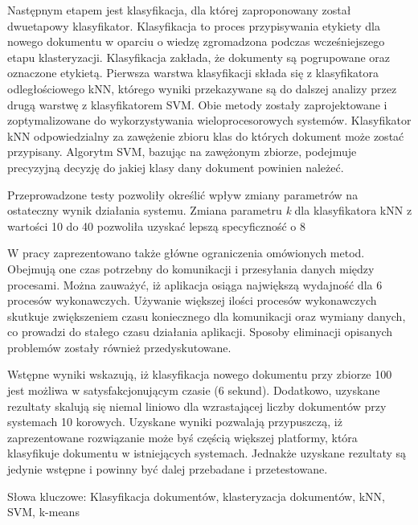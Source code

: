 Następnym etapem jest klasyfikacja, dla której zaproponowany został dwuetapowy klasyfikator. Klasyfikacja to proces przypisywania etykiety dla nowego dokumentu w oparciu o wiedzę zgromadzona podczas wcześniejszego etapu klasteryzacji. Klasyfikacja zakłada, że dokumenty są pogrupowane oraz oznaczone etykietą. Pierwsza warstwa klasyfikacji składa się z klasyfikatora odległościowego kNN, którego wyniki przekazywane są do dalszej analizy przez drugą warstwę z klasyfikatorem SVM. Obie metody zostały zaprojektowane i zoptymalizowane do wykorzystywania wieloprocesorowych systemów. Klasyfikator kNN odpowiedzialny za zawężenie zbioru klas do których dokument może zostać przypisany. Algorytm SVM, bazując na zawężonym zbiorze, podejmuje precyzyjną decyzję do jakiej klasy dany dokument powinien należeć.

Przeprowadzone testy pozwoliły określić wpływ zmiany parametrów na ostateczny wynik działania systemu. Zmiana parametru \textit{k} dla klasyfikatora kNN z wartości 10 do 40 pozwoliła uzyskać lepszą specyficzność o 8%

W pracy zaprezentowano także główne ograniczenia omówionych metod. Obejmują one czas potrzebny do komunikacji i przesyłania danych między procesami. Można zauważyć, iż aplikacja osiąga największą wydajność dla 6 procesów wykonawczych. Używanie większej ilości procesów wykonawczych skutkuje zwiększeniem czasu koniecznego dla komunikacji oraz wymiany danych, co prowadzi do stałego czasu działania aplikacji. Sposoby eliminacji opisanych problemów zostały również przedyskutowane.

Wstępne wyniki wskazują, iż klasyfikacja nowego dokumentu przy zbiorze 100 jest możliwa w satysfakcjonującym czasie (6 sekund). Dodatkowo, uzyskane rezultaty skalują się niemal liniowo dla wzrastającej liczby dokumentów przy systemach 10 korowych. Uzyskane wyniki pozwalają przypuszczą, iż zaprezentowane rozwiązanie może byś częścią większej platformy, która klasyfikuje dokumentu w istniejących systemach. Jednakże uzyskane rezultaty są jedynie wstępne i powinny być dalej przebadane i przetestowane.

Słowa kluczowe:
Klasyfikacja dokumentów, klasteryzacja dokumentów, kNN, SVM, k-means